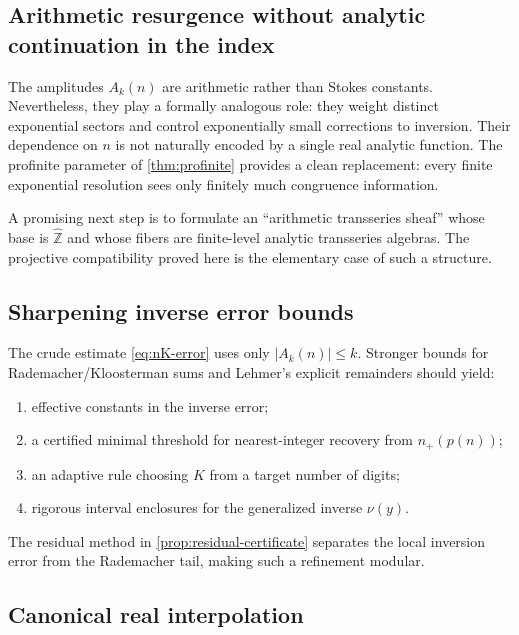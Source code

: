 \documentclass[11pt,a4paper]{article}
\numberwithin{equation}{section}
\theoremstyle{remark}
\newcommand{\ZZ}{\mathbb Z}
\begin{document}
\subsection{Arithmetic resurgence without analytic continuation in the index}

The amplitudes $A_k(n)$ are arithmetic rather than Stokes constants.  Nevertheless, they play a formally analogous role: they weight distinct exponential sectors and control exponentially small corrections to inversion.  Their dependence on $n$ is not naturally encoded by a single real analytic function.  The profinite parameter of \cref{thm:profinite} provides a clean replacement: every finite exponential resolution sees only finitely much congruence information.

A promising next step is to formulate an ``arithmetic transseries sheaf'' whose base is $\widehat{\ZZ}$ and whose fibers are finite-level analytic transseries algebras.  The projective compatibility proved here is the elementary case of such a structure.

\subsection{Sharpening inverse error bounds}

The crude estimate \cref{eq:nK-error} uses only $|A_k(n)|\le k$.  Stronger bounds for Rademacher/Kloosterman sums and Lehmer's explicit remainders should yield:
\begin{enumerate}
\item effective constants in the inverse error;
\item a certified minimal threshold for nearest-integer recovery from $n_+(p(n))$;
\item an adaptive rule choosing $K$ from a target number of digits;
\item rigorous interval enclosures for the generalized inverse $\nu(y)$.
\end{enumerate}
The residual method in \cref{prop:residual-certificate} separates the local inversion error from the Rademacher tail, making such a refinement modular.

\subsection{Canonical real interpolation}
\end{document}
